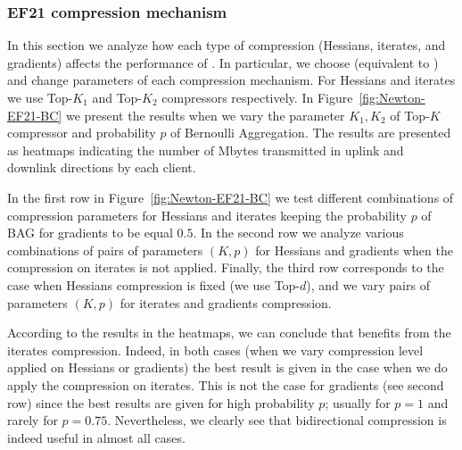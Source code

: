 \documentclass[11pt]{article}
\begin{document}
	\subsubsection{EF21 compression mechanism}
	
	In this section we analyze how each type of compression (Hessians, iterates, and gradients) affects the performance of . In particular, we choose  (equivalent to ) and change parameters of each compression mechanism. For Hessians and iterates we use Top-$K_1$ and Top-$K_2$ compressors respectively. In Figure~\ref{fig:Newton-EF21-BC} we present the results when we vary the parameter $K_1, K_2$ of Top-$K$ compressor and probability $p$ of Bernoulli Aggregation. The results are presented as heatmaps indicating the number of Mbytes transmitted in uplink and downlink directions by each client.
	
	In the first row in Figure~\ref{fig:Newton-EF21-BC} we test different combinations of compression parameters for Hessians and iterates keeping the probability $p$ of BAG for gradients to be equal $0.5$. In the second row we analyze various combinations of pairs of parameters $(K, p)$ for Hessians and gradients when the compression on iterates is not applied. Finally, the third row corresponds to the case when Hessians compression is fixed (we use Top-$d$), and we vary pairs of parameters $(K, p)$ for iterates and gradients compression.
	
	According to the results in the heatmaps, we can conclude that  benefits from the iterates compression. Indeed, in both cases (when we vary compression level applied on Hessians or gradients) the best result is given in the case when we do apply the compression on iterates. This is not the case for gradients (see second row) since the best results are given for high probability $p$; usually for $p=1$ and rarely for $p=0.75$. Nevertheless, we clearly see that bidirectional compression is indeed useful in almost all cases.
	
\end{document}
